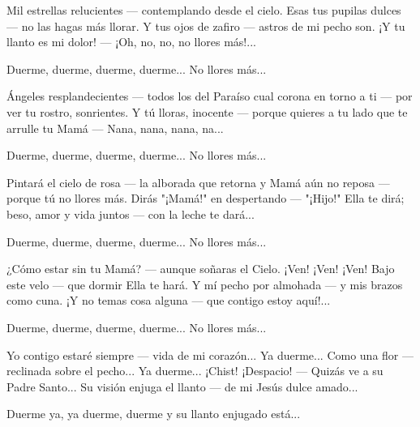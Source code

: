 \documentclass[12pt]{book} %
\begin{document}
Mil estrellas relucientes — contemplando desde el cielo. 
Esas tus pupilas dulces — no las hagas más llorar. 
Y tus ojos de zafiro — astros de mi pecho son. 
¡Y tu llanto es mi dolor! — ¡Oh, no, no, no llores más!... 
 
Duerme, duerme, duerme, duerme... 
No llores más... 
 
Ángeles resplandecientes — todos los del Paraíso cual corona en torno a ti — por ver tu rostro, sonrientes. Y tú lloras, inocente — porque quieres a tu lado que te arrulle tu Mamá — Nana, nana, nana, na... 
 
Duerme, duerme, duerme, duerme... No llores más... 
 
Pintará el cielo de rosa — la alborada que retorna y Mamá aún no reposa — porque tú no llores más. Dirás "¡Mamá!" en despertando — "¡Hijo!" Ella te dirá; beso, amor y vida juntos — con la leche te dará... 
 
Duerme, duerme, duerme, duerme... No llores más... 
 
¿Cómo estar sin tu Mamá? — aunque soñaras el Cielo. 
¡Ven! ¡Ven! ¡Ven! Bajo este velo — que dormir Ella te hará. 
Y mí pecho por almohada — y mis brazos como cuna. ¡Y no temas cosa alguna — que contigo estoy aquí!... 
 
Duerme, duerme, duerme, duerme... No llores más... 
 
 
Yo contigo estaré siempre — vida de mi corazón... 
Ya duerme... Como una flor — reclinada sobre el pecho... 
Ya duerme... ¡Chist! ¡Despacio! — Quizás ve a su Padre Santo... Su visión enjuga el llanto — de mi Jesús dulce amado... 
 
Duerme ya, ya duerme, duerme y su llanto enjugado está... 
 
\end{document}
